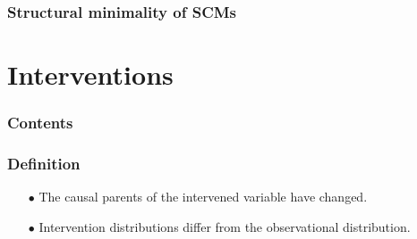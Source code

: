 \documentclass{beamer}
\begin{document}
\begin{frame}
    \frametitle{Structural minimality of SCMs} 
\end{frame}

\section{Interventions}

\begin{frame}
    \frametitle{Contents}
    \tableofcontents[currentsection]
\end{frame}

\begin{frame}
    \frametitle{Definition} 
    \begin{itemize}
        \item[$\bullet$] The causal parents of the intervened variable have changed. 
        \item[$\bullet$] Intervention distributions differ from the observational distribution.
    \end{itemize}
\end{frame}
\end{document}
